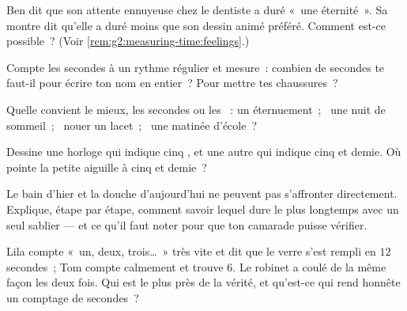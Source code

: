 \begin{exercise}[$\star$]\label{exo:g2:measuring-time:5}
Ben dit que son attente ennuyeuse chez le dentiste a duré «~une
éternité~». Sa montre dit qu'elle a duré moins que son dessin animé
préféré. Comment est-ce possible~? (Voir
\cref{rem:g2:measuring-time:feelings}.)
\end{exercise}

\begin{exercise}[$\star$]\label{exo:g2:measuring-time:6}
Compte les secondes à un rythme régulier et mesure~: combien de
secondes te faut-il pour écrire ton nom en entier~? Pour mettre tes
chaussures~?
\end{exercise}

\begin{exercise}[$\star$]\label{exo:g2:measuring-time:7}
Quelle  convient le mieux, les secondes ou les ~: un
éternuement~; \ une nuit de sommeil~; \ nouer un lacet~; \ une matinée
d'école~?
\end{exercise}

\begin{exercise}[$\star$]\label{exo:g2:measuring-time:8}
Dessine une horloge qui indique cinq , et une autre qui indique
cinq  et demie. Où pointe la petite aiguille à cinq  et
demie~?
\end{exercise}

\begin{exercise}[$\star\star$]\label{exo:g2:measuring-time:9}
Le bain d'hier et la douche d'aujourd'hui ne peuvent pas s'affronter
directement. Explique, étape par étape, comment savoir lequel dure le
plus longtemps avec un seul sablier --- et ce qu'il faut noter pour
que ton camarade puisse vérifier.
\end{exercise}

\begin{exercise}[$\star\star$]\label{exo:g2:measuring-time:10}
Lila compte «~un, deux, trois\dots~» très vite et dit que le verre
s'est rempli en $12$ secondes~; Tom compte calmement et trouve $6$.
Le robinet a coulé de la même façon les deux fois. Qui est le plus
près de la vérité, et qu'est-ce qui rend honnête un comptage de
secondes~?
\end{exercise}
